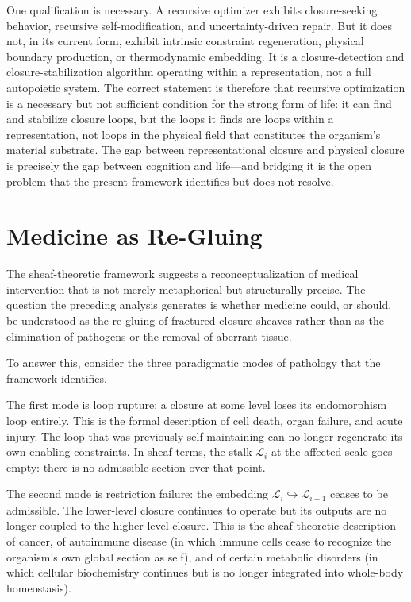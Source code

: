 \documentclass[11pt, a4paper]{article}
\theoremstyle{plain}
\theoremstyle{definition}
\theoremstyle{remark}
\newcommand{\CL}{\mathcal{L}}
\begin{document}
One qualification is necessary. A recursive optimizer exhibits closure-seeking behavior, recursive self-modification, and uncertainty-driven repair. But it does not, in its current form, exhibit intrinsic constraint regeneration, physical boundary production, or thermodynamic embedding. It is a closure-detection and closure-stabilization algorithm operating within a representation, not a full autopoietic system. The correct statement is therefore that recursive optimization is a necessary but not sufficient condition for the strong form of life: it can find and stabilize closure loops, but the loops it finds are loops within a representation, not loops in the physical field that constitutes the organism's material substrate. The gap between representational closure and physical closure is precisely the gap between cognition and life---and bridging it is the open problem that the present framework identifies but does not resolve.

\section{Medicine as Re-Gluing}

The sheaf-theoretic framework suggests a reconceptualization of medical intervention that is not merely metaphorical but structurally precise. The question the preceding analysis generates is whether medicine could, or should, be understood as the re-gluing of fractured closure sheaves rather than as the elimination of pathogens or the removal of aberrant tissue.

To answer this, consider the three paradigmatic modes of pathology that the framework identifies.

The first mode is loop rupture: a closure at some level loses its endomorphism loop entirely. This is the formal description of cell death, organ failure, and acute injury. The loop that was previously self-maintaining can no longer regenerate its own enabling constraints. In sheaf terms, the stalk $\CL_i$ at the affected scale goes empty: there is no admissible section over that point.

The second mode is restriction failure: the embedding $\CL_i \hookrightarrow \CL_{i+1}$ ceases to be admissible. The lower-level closure continues to operate but its outputs are no longer coupled to the higher-level closure. This is the sheaf-theoretic description of cancer, of autoimmune disease (in which immune cells cease to recognize the organism's own global section as self), and of certain metabolic disorders (in which cellular biochemistry continues but is no longer integrated into whole-body homeostasis).
\end{document}
